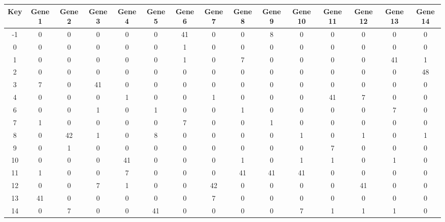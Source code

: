 \begin{tabular}{|c|c|c|c|c|c|c|c|c|c|c|c|c|c|c|}
\hline
Key & Gene 1 & Gene 2 & Gene 3 & Gene 4 & Gene 5 & Gene 6 & Gene 7 & Gene 8 & Gene 9 & Gene 10 & Gene 11 & Gene 12 & Gene 13 & Gene 14 \\
\hline
-1 & 0 & 0 & 0 & 0 & 0 & 41 & 0 & 0 & 8 & 0 & 0 & 0 & 0 & 0 \\
0 & 0 & 0 & 0 & 0 & 0 & 1 & 0 & 0 & 0 & 0 & 0 & 0 & 0 & 0 \\
1 & 0 & 0 & 0 & 0 & 0 & 1 & 0 & 7 & 0 & 0 & 0 & 0 & 41 & 1 \\
2 & 0 & 0 & 0 & 0 & 0 & 0 & 0 & 0 & 0 & 0 & 0 & 0 & 0 & 48 \\
3 & 7 & 0 & 41 & 0 & 0 & 0 & 0 & 0 & 0 & 0 & 0 & 0 & 0 & 0 \\
4 & 0 & 0 & 0 & 1 & 0 & 0 & 1 & 0 & 0 & 0 & 41 & 7 & 0 & 0 \\
6 & 0 & 0 & 1 & 0 & 1 & 0 & 0 & 1 & 0 & 0 & 0 & 0 & 7 & 0 \\
7 & 1 & 0 & 0 & 0 & 0 & 7 & 0 & 0 & 1 & 0 & 0 & 0 & 0 & 0 \\
8 & 0 & 42 & 1 & 0 & 8 & 0 & 0 & 0 & 0 & 1 & 0 & 1 & 0 & 1 \\
9 & 0 & 1 & 0 & 0 & 0 & 0 & 0 & 0 & 0 & 0 & 7 & 0 & 0 & 0 \\
10 & 0 & 0 & 0 & 41 & 0 & 0 & 0 & 1 & 0 & 1 & 1 & 0 & 1 & 0 \\
11 & 1 & 0 & 0 & 7 & 0 & 0 & 0 & 41 & 41 & 41 & 0 & 0 & 0 & 0 \\
12 & 0 & 0 & 7 & 1 & 0 & 0 & 42 & 0 & 0 & 0 & 0 & 41 & 0 & 0 \\
13 & 41 & 0 & 0 & 0 & 0 & 0 & 7 & 0 & 0 & 0 & 0 & 0 & 0 & 0 \\
14 & 0 & 7 & 0 & 0 & 41 & 0 & 0 & 0 & 0 & 7 & 1 & 1 & 1 & 0 \\
\hline
\end{tabular}